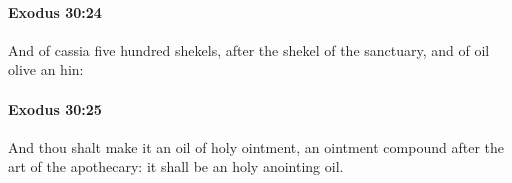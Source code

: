 		\paragraph{Exodus 30:24} %
			\label{EXODUS-30-24}

			And of cassia five hundred shekels, after the shekel of the sanctuary, and of oil olive an hin:


		\paragraph{Exodus 30:25} %
			\label{EXODUS-30-25}

			And thou shalt make it an oil of holy ointment, an ointment compound after the art of the apothecary: it shall be an holy anointing oil.


